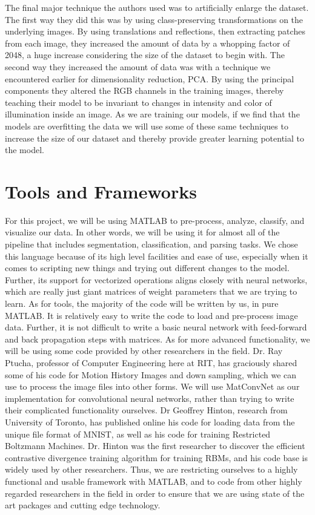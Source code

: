 \documentclass[12pt]{article}  %
\begin{document}
The final major technique the authors used was to artificially enlarge the dataset.  The first way they did this was by using class-preserving transformations on the underlying images.  By using translations and reflections, then extracting patches from each image, they increased the amount of data by a whopping factor of 2048, a huge increase considering the size of the dataset to begin with.  The second way they increased the amount of data was with a technique we encountered earlier for dimensionality reduction, PCA.  By using the principal components they altered the RGB channels in the training images, thereby teaching their model to be invariant to changes in intensity and color of illumination inside an image.  As we are training our models, if we find that the models are overfitting the data we will use some of these same techniques to increase the size of our dataset and thereby provide greater learning potential to the model.         

\section{Tools and Frameworks}
\label {Tools and Frameworks}

For this project, we will be using MATLAB to pre-process, analyze, classify, and visualize our data.  In other words, we will be using it for almost all of the pipeline that includes segmentation, classification, and parsing tasks.  We chose this language because of its high level facilities and ease of use, especially when it comes to scripting new things and trying out different changes to the model.  Further, its support for vectorized operations aligns closely with neural networks, which are really just giant matrices of weight parameters that we are trying to learn.  As for tools, the majority of the code will be written by us, in pure MATLAB.  It is relatively easy to write the code to load and pre-process image data.  Further, it is not difficult to write a basic neural network with feed-forward and back propagation steps with matrices.  As for more advanced functionality, we will be using some code provided by other researchers in the field.  Dr. Ray Ptucha, professor of Computer Engineering here at RIT, has graciously shared some of his code for Motion History Images and down sampling, which we can use to process the image files into other forms.  We will use MatConvNet \cite{matcon} as our implementation for convolutional neural networks, rather than trying to write their complicated functionality ourselves.  Dr Geoffrey Hinton, research from University of Toronto, has published online his code for loading data from the unique file format of MNIST, as well as his code for training Restricted Boltzmann Machines. Dr. Hinton was the first researcher to discover the efficient contrastive divergence training algorithm for training RBMs, and his code base is widely used by other researchers.  Thus, we are restricting ourselves to a highly functional and usable framework with MATLAB, and to code from other highly regarded researchers in the field in order to ensure that we are using state of the art packages and cutting edge technology.
\end{document}
